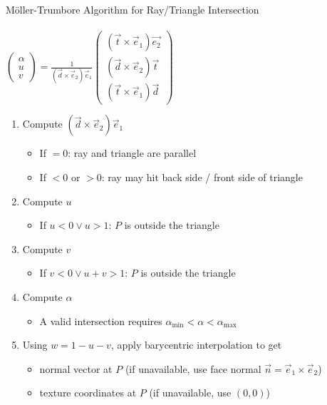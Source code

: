 \documentclass[utf8,stillsansserifmath,fleqn,t]{beamer}
\newcommand{\ds}{\displaystyle}
\begin{document}
\begin{frame}[label=möller-trumbore-1]
\frametitle{\insertsection}
Möller-Trumbore Algorithm for Ray/Triangle Intersection\\~\\
$\ds \begin{pmatrix}\alpha\\u\\v\end{pmatrix} = \frac{1}{(\vec{d}\times\vec{e}_2)\vec{e}_1}
\begin{pmatrix}(\vec{t}\times \vec{e}_1)\vec{e_2}\\
               (\vec{d}\times \vec{e}_2)\vec{t}\\
               (\vec{t}\times \vec{e}_1)\vec{d}\end{pmatrix}$
\begin{enumerate}
\item Compute $(\vec{d}\times\vec{e}_2)\vec{e}_1$
    \begin{itemize}
    \item If $= 0$: ray and triangle are parallel
    \item If $< 0$ or $>0$: ray may hit back side / front side of triangle
    \end{itemize}
\item Compute $u$
    \begin{itemize}
    \item If $u<0 \vee u>1$: $P$ is outside the triangle
    \end{itemize}
\item Compute $v$
    \begin{itemize}
    \item If $v<0 \vee u+v>1$: $P$ is outside the triangle
    \end{itemize}
\item Compute $\alpha$
    \begin{itemize}
    \item A valid intersection requires $\alpha_{\min} < \alpha < \alpha_{\max}$
    \end{itemize}
\item Using $w=1-u-v$, apply barycentric interpolation to get
    \begin{itemize}
    \item normal vector at $P$ (if unavailable, use face normal $\vec{n}=\vec{e}_1 \times \vec{e}_2$)
    \item texture coordinates at $P$ (if unavailable, use $(0,0)$)
    \end{itemize}
\end{enumerate}
\end{frame}
\end{document}
